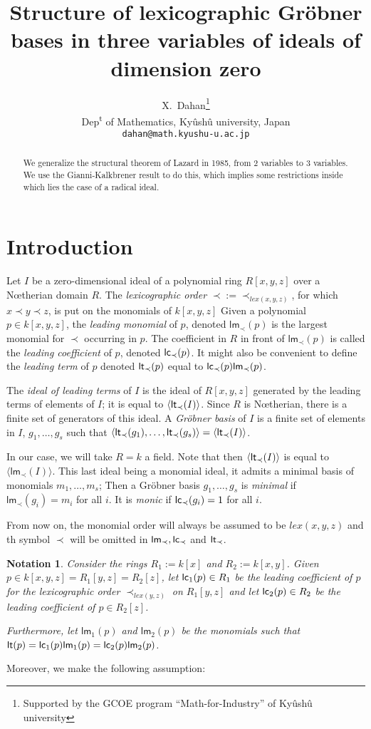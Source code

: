 \documentclass[a4paper,11pt]{article}
\title{Structure of lexicographic Gr\"obner bases in three variables
of ideals of dimension zero}
\author{X.~Dahan\footnote{Supported by the GCOE program ``Math-for-Industry''
of Ky\^ush\^u university}\bigskip
\\
Dep\textsuperscript{t} of Mathematics, Ky\^ush\^u university, Japan\\
{\tt dahan@math.kyushu-u.ac.jp}}
\date{}
\def\lm{\ensuremath{{\mathsf{lm}}}}
\def\lt{\ensuremath{{\sf lt}}}
\def\lc{\ensuremath{{\sf lc}}}
\def\l{\ensuremath{\langle}}
\def\r{\ensuremath{\rangle}}
\newtheorem{Not}{Notation}
\begin{document}
\maketitle

\begin{abstract}
We generalize  the structural theorem of Lazard in 1985,
from 2 variables to 3 variables.
We use the Gianni-Kalkbrener result to do this,
which implies some restrictions
inside which lies the case of a radical ideal.
\end{abstract}

\section{Introduction}
Let $I$ be a zero-dimensional ideal of a polynomial
ring $R[x,y,z]$ over a N\oe therian domain $R$.
The {\em lexicographic order}
$\prec:=\prec_{lex(x,y,z)}$, for which
$x\prec y\prec z$,
is put on the monomials 
of $k[x,y,z]$ 
Given a polynomial $p\in k[x,y,z]$,
the {\em leading monomial} of $p$,
denoted $\lm_{\prec}(p)$ is the largest
monomial for $\prec$ occurring in $p$.
The coefficient in $R$ in front of $\lm_{\prec}(p)$
is called the {\em leading coefficient} of $p$,
denoted $\lc_{\prec}(p)$.
It might also be convenient to define the
{\em leading term} of $p$
denoted $\lt_{\prec}(p)$ equal to $\lc_{\prec}(p) \lm_{\prec}(p)$.

The {\em ideal of leading terms} of $I$ is the ideal
of $R[x,y,z]$ generated by the leading terms of elements
of $I$; it is equal to $\l \lt_{\prec}(I)\r$.
Since $R$ is N\oe therian, there is a finite set of generators
of this ideal.
A {\em Gr\"obner basis} of $I$
is a finite set of elements in $I$,
$g_1,\ldots,g_s$ such that $\l \lt_{\prec}(g_1),\ldots ,
\lt_{\prec}(g_s)\r = \l \lt_{\prec}(I)\r$.

In our case, we will take $R=k$ a field.
Note that then $\l \lt_{\prec}(I)\r$
is equal to $\l \lm_{\prec}(I)\r$.
This last ideal being a monomial ideal, it admits a minimal basis
of monomials $m_1,\ldots,m_s$; Then a Gr\"obner basis
$g_1,\ldots,g_s$ is {\em minimal} if $\lm_{\prec}(g_i)=m_i$ for all $i$.
It is  {\em monic} if $\lc_\prec(g_i)=1$ for all $i$.

From now on, the monomial order will always be assumed
to be $lex(x,y,z)$ and th symbol $\prec$ will be omitted
in $\lm_\prec,\lc_\prec$ and $\lt_\prec$.

\begin{Not}
Consider the rings $R_1:=k[x]$ and $R_2:=k[x,y]$.
Given $p \in k[x,y,z]=R_1[y,z]=R_2[z]$, let $\lc_1(p)\in R_1$
be the leading coefficient of $p$ for the lexicographic order $\prec_{lex(y,z)}$
on $R_1[y,z]$ and let $\lc_2(p)\in R_2$ be the leading coefficient
of $p\in R_2[z]$.

Furthermore, let $\lm_1(p)$ and $\lm_2(p)$ be the monomials
such that
$\lt(p)=\lc_1(p)\lm_1(p)=\lc_2(p)\lm_2(p)$.
\end{Not}
Moreover, we make the following  assumption:
\smallskip
\end{document}
